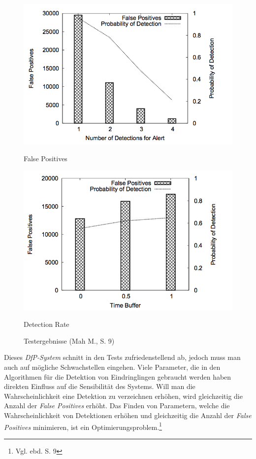 \begin{figure}
\centering
\begin{minipage}{.5\textwidth}
  \centering
  \includegraphics[scale=0.6]{pictures/false_pos}
  \caption*{False Positives}
\end{minipage}%
\begin{minipage}{.5\textwidth}
  \centering
  \includegraphics[scale=0.6]{pictures/detection}
  \caption*{Detection Rate}
\end{minipage}
\caption{Testergebnisse (Mah M., S. 9)}
\end{figure}

Dieses \textit{DfP-System} schnitt in den Tests zufriedenstellend ab, jedoch muss man auch auf mögliche Schwachstellen eingehen. Viele Parameter, die in den Algorithmen für die Detektion von Eindringlingen gebraucht werden haben direkten Einfluss auf die Sensibilität des Systems. Will man die Wahrscheinlichkeit eine Detektion zu verzeichnen erhöhen, wird gleichzeitig die Anzahl der \textit{False Positives} erhöht. Das Finden von Parametern, welche die Wahrscheinlichkeit von Detektionen erhöhen und gleichzeitig die Anzahl der \textit{False Positives} minimieren, ist ein Optimierungsproblem.\footnote{Vgl. ebd. S. 9}

